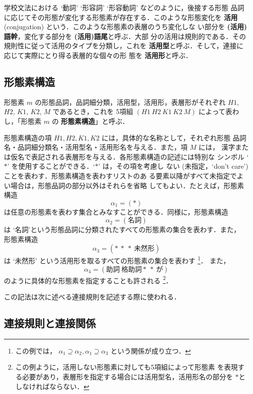 \documentclass[a4j,titlepage]{jarticle}
\begin{document}
学校文法における `動詞' `形容詞' `形容動詞' などのように，後接する形態
品詞に応じてその形態が変化する形態素が存在する．このような形態変化を 
{\bf 活用} (conjugation) という．このような形態素の表層のうち変化しな
い部分を {\bf (活用)語幹}，変化する部分を {\bf (活用)語尾}と呼ぶ．大部
分の活用は規則的である．その規則性に従って活用のタイプを分類し，これを 
{\bf 活用型}と呼ぶ．そして，連接に応じて実際にとり得る表層的な個々の形
態を {\bf 活用形}と呼ぶ．

\subsection{形態素構造}
\label{ss:jmg-ms}

形態素 $m$ の形態品詞，品詞細分類，活用型，活用形，表層形がそれぞれ 
$H1$, $H2$, $K1$, $K2$, $M$ であるとき，これを 5項組 $(H1\ H2\ K1\ K2\
M)$ によって表わし，「形態素 $m$ の {\bf 形態素構造}」と呼ぶ．

形態素構造の項 $H1, H2, K1, K2$ には，具体的な名称として，それぞれ形態
品詞名・品詞細分類名・活用型名・活用形名を与える．また，項 $M$ には，
漢字または仮名で表記される表層形を与える．各形態素構造の記述には特別な
シンボル `$\ast$' を使用することができる．`$\ast$' は，その項を考慮し
ない (未指定，`don't care') ことを表わす．形態素構造を表わすリストのあ
る要素以降がすべて未指定でよい場合は，形態品詞の部分以外はそれらを省略
してもよい．たとえば，形態素構造
\[ \alpha_{1} = (\ast) \]
は任意の形態素を表わす集合とみなすことができる．同様に，形態素構造
\[ \alpha_{2} = (\mbox{名詞}) \]
は `名詞'という形態品詞に分類されたすべての形態素の集合を表わす．また，
形態素構造
\[ \alpha_{3} = (\ast\ \ast\ \ast\ \mbox{未然形}) \]
は `未然形' という活用形を取るすべての形態素の集合を表わす
\footnote{
この例では，
\(\alpha_{1} \supseteq \alpha_{2}, \alpha_{1} \supseteq \alpha_{3}\)
という関係が成り立つ．
}．
また，
\[ \alpha_{4} = ( \mbox{助詞} \ \mbox{格助詞} \ast\ \ast\ \mbox{が} ) \]
のように具体的な形態素を指定することも許される
\footnote{この例ように，活用しない形態素に対しても5項組によって形態素
を表現する必要があり，表層形を指定する場合には活用型名，活用形名の部分を
$\ast$としなければならない．}．

この記法は次に述べる連接規則を記述する際に使われる．

\subsection{連接規則と連接関係}
\label{ss:jmg-c}
\end{document}
